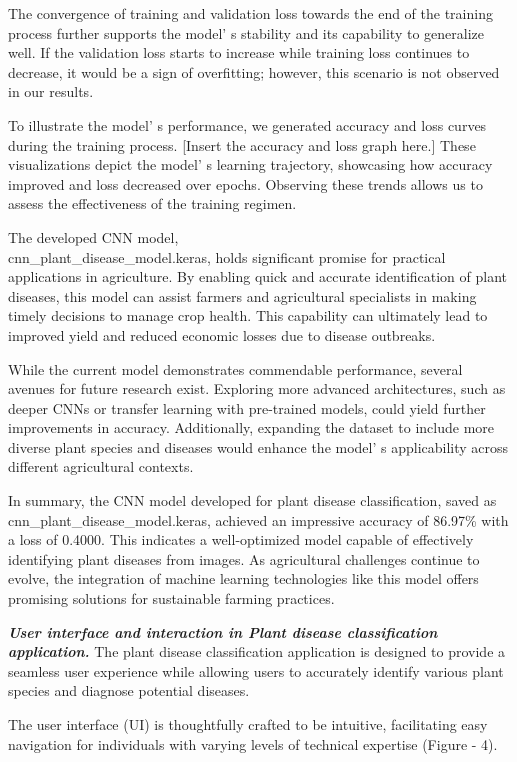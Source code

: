 \begin{multicols}{2}
The convergence of training and validation loss towards the end of the
training process further supports the model' s stability
and its capability to generalize well. If the validation loss starts to
increase while training loss continues to decrease, it would be a sign
of overfitting; however, this scenario is not observed in our results.

To illustrate the model' s performance, we generated
accuracy and loss curves during the training process. {[}Insert the
accuracy and loss graph here.{]} These visualizations depict the
model' s learning trajectory, showcasing how accuracy
improved and loss decreased over epochs. Observing these trends allows
us to assess the effectiveness of the training regimen.

The developed CNN model, \\cnn\_plant\_disease\_model.keras, holds
significant promise for practical applications in agriculture. By
enabling quick and accurate identification of plant diseases, this model
can assist farmers and agricultural specialists in making timely
decisions to manage crop health. This capability can ultimately lead to
improved yield and reduced economic losses due to disease outbreaks.

While the current model demonstrates commendable performance, several
avenues for future research exist. Exploring more advanced
architectures, such as deeper CNNs or transfer learning with pre-trained
models, could yield further improvements in accuracy. Additionally,
expanding the dataset to include more diverse plant species and diseases
would enhance the model' s applicability across different
agricultural contexts.

In summary, the CNN model developed for plant disease classification,
saved as cnn\_plant\_disease\_model.keras, achieved an impressive
accuracy of 86.97\% with a loss of 0.4000. This indicates a
well-optimized model capable of effectively identifying plant diseases
from images. As agricultural challenges continue to evolve, the
integration of machine learning technologies like this model offers
promising solutions for sustainable farming practices.

\emph{{\bfseries User interface and interaction in Plant disease
classification application.}} The plant disease classification
application is designed to provide a seamless user experience while
allowing users to accurately identify various plant species and diagnose
potential diseases.

The user interface (UI) is thoughtfully crafted to be intuitive,
facilitating easy navigation for individuals with varying levels of
technical expertise (Figure - 4).
\end{multicols}

